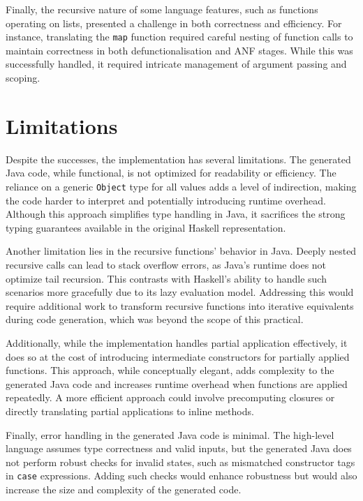 Finally, the recursive nature of some language features, such as functions
operating on lists, presented a challenge in both correctness and efficiency.
For instance, translating the \texttt{map} function required careful nesting of function
calls to maintain correctness in both defunctionalisation and ANF stages. While
this was successfully handled, it required intricate management of argument
passing and scoping.

\section{Limitations}
Despite the successes, the implementation has several limitations. The
generated Java code, while functional, is not optimized for readability or
efficiency. The reliance on a generic \texttt{Object} type for all values adds a level
of indirection, making the code harder to interpret and potentially introducing
runtime overhead. Although this approach simplifies type handling in Java, it
sacrifices the strong typing guarantees available in the original Haskell
representation.

Another limitation lies in the recursive functions’ behavior in Java. Deeply
nested recursive calls can lead to stack overflow errors, as Java's runtime
does not optimize tail recursion. This contrasts with Haskell’s ability to
handle such scenarios more gracefully due to its lazy evaluation model.
Addressing this would require additional work to transform recursive functions
into iterative equivalents during code generation, which was beyond the scope
of this practical.

Additionally, while the implementation handles partial application effectively,
it does so at the cost of introducing intermediate constructors for partially
applied functions. This approach, while conceptually elegant, adds complexity
to the generated Java code and increases runtime overhead when functions are
applied repeatedly. A more efficient approach could involve precomputing
closures or directly translating partial applications to inline methods.

Finally, error handling in the generated Java code is minimal. The high-level
language assumes type correctness and valid inputs, but the generated Java does
not perform robust checks for invalid states, such as mismatched constructor
tags in \texttt{case} expressions. Adding such checks would enhance robustness but would
also increase the size and complexity of the generated code.

